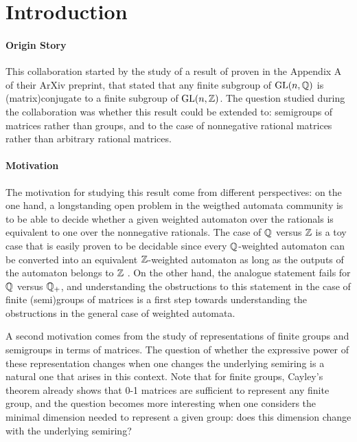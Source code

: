 \section{Introduction}

\paragraph*{Origin Story} This collaboration started by the study of a result
of \cite{BUHAKISTTA20} proven in the Appendix A of their ArXiv preprint, that
stated that any finite subgroup of $\mathrm{GL}(n, \mathbb{Q})$ is \kl(matrix){conjugate} to a
finite subgroup of $\mathrm{GL}(n, \mathbb{Z})$. The question studied during the collaboration
was whether this result could be extended to: semigroups of matrices rather
than groups, and to the case of nonnegative rational matrices rather than
arbitrary rational matrices. 


\paragraph*{Motivation} The motivation for studying this result come from
different perspectives: on the one hand, a longstanding open problem in the
weigthed automata community is to be able to decide whether a given weighted
automaton over the rationals is equivalent to one over the nonnegative
rationals. The case of $\mathbb{Q}$ versus $\mathbb{Z}$ is a toy case that is easily proven
to be decidable since every $\mathbb{Q}$-weighted automaton can be converted into an
equivalent $\mathbb{Z}$-weighted automaton as long as the outputs of the automaton
belongs to $\mathbb{Z}$ \cite{BERE10}. On the other hand, the analogue statement
fails for $\mathbb{Q}$ versus $\mathbb{Q}_+$, and understanding the obstructions to this
statement in the case of finite (semi)groups of matrices is a first step
towards understanding the obstructions in the general case of weighted
automata.

A second motivation comes from the study of representations of finite groups
and semigroups in terms of matrices. The question of whether the expressive
power of these representation changes when one changes the underlying semiring
is a natural one that arises in this context. Note that for finite groups,
Cayley's theorem already shows that 0-1 matrices are sufficient to represent
any finite group, and the question becomes more interesting when one considers
the minimal dimension needed to represent a given group: does this dimension
change with the underlying semiring?



